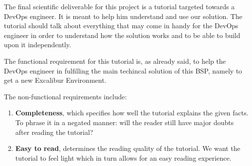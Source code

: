 
The final scientific deliverable for this project is a tutorial
targeted towards a DevOps engineer. It is meant to help him understand
and use our solution. The tutorial should talk about everything that
may come in handy for the DevOps engineer in order to understand how
the solution works and to be able to build upon it independently.

The functional requirement for this tutorial is, as already said, to
help the DevOps engineer in fulfilling the main techincal solution of
this BSP, namely to get a new Excalibur Environment.

The non-functional requirements include:
\begin{enumerate}
	\item \textbf{Completeness}, which specifies how well the tutorial
		 explains the given facts. To phrase it in a negated manner:
		 will the reader still have major doubts after reading the
		 tutorial?
	\item \textbf{Easy to read}, determines the reading quality of
		the tutorial.  We want the tutorial to feel light which in
		turn allows for an easy reading experience.
\end{enumerate}
